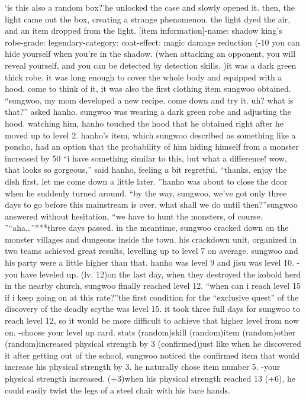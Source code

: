‘is this also a random box?’he unlocked the case and slowly opened it.
 then, the light came out the box, creating a strange phenomenon.
 the light dyed the air, and an item dropped from the light.
[item information]-name: shadow king’s robe-grade: legendary-category: coat-effect: magic damage reduction (-10%
 you can hide yourself when you’re in the shadow.
 (when attacking an opponent, you will reveal yourself, and you can be detected by detection skills.
)it was a dark green thick robe.
 it was long enough to cover the whole body and equipped with a hood.
 come to think of it, it was also the first clothing item sungwoo obtained.
“sungwoo, my mom developed a new recipe.
 come down and try it.
 uh? what is that?” asked hanho.
sungwoo was wearing a dark green robe and adjusting the hood.
 watching him, hanho touched the hood that he obtained right after he moved up to level 2.
hanho’s item, which sungwoo described as something like a poncho, had an option that the probability of him hiding himself from a monster increased by 50%
“i have something similar to this, but what a difference! wow, that looks so gorgeous,” said hanho, feeling a bit regretful.
“thanks.
 enjoy the dish first.
 let me come down a little later.
”hanho was about to close the door when he suddenly turned around.
“by the way, sungwoo, we’ve got only three days to go before this mainstream is over.
 what shall we do until then?”sungwoo answered without hesitation, “we have to hunt the monsters, of course.
”“aha…”***three days passed.
in the meantime, sungwoo cracked down on the monster villages and dungeons inside the town.
 his crackdown unit, organized in two teams achieved great results, levelling up to level 7 on average.
sungwoo and his party were a little higher than that.
 hanho was level 9 and jisu was level 10.
-you have leveled up.
 (lv.
 12)on the last day, when they destroyed the kobold herd in the nearby church, sungwoo finally reached level 12.
“when can i reach level 15 if i keep going on at this rate?”the first condition for the “exclusive quest” of the discovery of the deadly scythe was level 15.
 it took three full days for sungwoo to reach level 12, so it would be more difficult to achieve that higher level from now on.
-choose your level up card.
stats (random)skill (random)item (random)other (random)increased physical strength by 3 (confirmed)just like when he discovered it after getting out of the school, sungwoo noticed the confirmed item that would increase his physical strength by 3.
 he naturally chose item number 5.
-your physical strength increased.
 (+3)when his physical strength reached 13 (+6), he could easily twist the legs of a steel chair with his bare hands.


